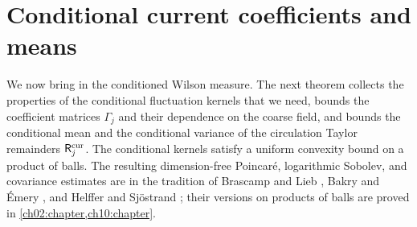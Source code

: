 \section{Conditional current coefficients and means}\label{ch28:sec:means}

We now bring in the conditioned Wilson measure. The next theorem collects the properties of the conditional fluctuation kernels that we need, bounds the coefficient matrices $\Gamma_j$ and their dependence on the coarse field, and bounds the conditional mean and the conditional variance of the circulation Taylor remainders $\mathsf R_j^{\rm cur}$. The conditional kernels satisfy a uniform convexity bound on a product of balls. The resulting dimension-free Poincaré, logarithmic Sobolev, and covariance estimates are in the tradition of Brascamp and Lieb \cite{BrascampLieb1976}, Bakry and Émery \cite{BakryEmery1985}, and Helffer and Sjöstrand \cite{HelfferSjostrand1994}; their versions on products of balls are proved in \cref{ch02:chapter,ch10:chapter}.


